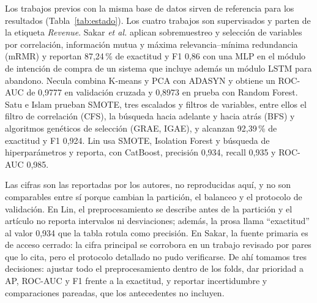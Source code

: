 \documentclass[journal]{IEEEtran}
\begin{document}
Los trabajos previos con la misma base de datos sirven de referencia para los resultados
(Tabla~\ref{tab:estado}). Los cuatro trabajos son supervisados y parten de la etiqueta
\textit{Revenue}. Sakar \textit{et al.} \cite{ref_sakar} aplican sobremuestreo y selección de
variables por correlación, información mutua y máxima relevancia--mínima redundancia (mRMR)
y reportan 87,24\,\% de exactitud y F1 0,86 con una MLP en el módulo de intención de compra
de un sistema que incluye además un módulo LSTM para abandono. Necula \cite{ref_necula}
combina K-means y PCA con ADASYN y obtiene un ROC-AUC de 0,9777 en validación cruzada y
0,8973 en prueba con Random Forest. Satu e Islam \cite{ref_satu} prueban SMOTE, tres
escalados y filtros de variables, entre ellos el filtro de correlación (CFS), la búsqueda
hacia adelante y hacia atrás (BFS) y algoritmos genéticos de selección (GRAE, IGAE), y
alcanzan 92,39\,\% de exactitud y F1 0,924. Lin \cite{ref_lin} usa SMOTE, Isolation Forest y
búsqueda de hiperparámetros y reporta, con CatBoost, precisión 0,934, recall 0,935 y ROC-AUC
0,985.

Las cifras son las reportadas por los autores, no reproducidas aquí, y no son comparables
entre sí porque cambian la partición, el balanceo y el protocolo de validación. En Lin, el
preprocesamiento se describe antes de la partición y el artículo no reporta intervalos ni
desviaciones; además, la prosa llama ``exactitud'' al valor 0,934 que la tabla rotula como
precisión. En Sakar, la fuente primaria es de acceso cerrado: la cifra principal se
corrobora en un trabajo revisado por pares que lo cita, pero el protocolo detallado no
pudo verificarse. De ahí tomamos tres decisiones: ajustar todo el preprocesamiento
dentro de los folds, dar prioridad a AP, ROC-AUC y F1 frente a la exactitud, y reportar
incertidumbre y comparaciones pareadas, que los antecedentes no incluyen.
\end{document}
